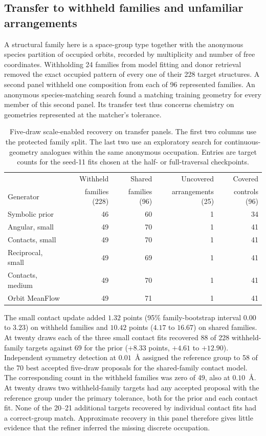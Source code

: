 \subsection{Transfer to withheld families and unfamiliar arrangements}

A structural family here is a space-group type together with the anonymous species partition of occupied orbits, recorded by multiplicity and number of free coordinates. Withholding 24 families from model fitting and donor retrieval removed the exact occupied pattern of every one of their 228 target structures. A second panel withheld one composition from each of 96 represented families. An anonymous species-matching search found a matching training geometry for every member of this second panel. Its transfer test thus concerns chemistry on geometries represented at the matcher's tolerance.

\begin{table}[tbp]\centering\small
\caption{Five-draw scale-enabled recovery on transfer panels. The first two columns use the protected family split. The last two use an exploratory search for continuous-geometry analogues within the same anonymous occupation. Entries are target counts for the seed-11 fits chosen at the half- or full-traversal checkpoints.}
\label{tab:gen-transfer}
\begin{tabular}{lrrrr}\hline
 & Withheld & Shared & Uncovered & Covered\\
Generator & families (228) & families (96) & arrangements (25) & controls (96)\\\hline
Symbolic prior & 46 & 60 & 1 & 34\\
Angular, small & 49 & 70 & 1 & 41\\
Contacts, small & 49 & 70 & 1 & 41\\
Reciprocal, small & 49 & 69 & 1 & 41\\
Contacts, medium & 49 & 70 & 1 & 41\\
Orbit MeanFlow & 49 & 71 & 1 & 41\\\hline
\end{tabular}
\end{table}

The small contact update added $1.32$ points (95\% family-bootstrap interval $0.00$ to $3.23$) on withheld families and $10.42$ points ($4.17$ to $16.67$) on shared families. At twenty draws each of the three small contact fits recovered 88 of 228 withheld-family targets against 69 for the prior ($+8.33$ points, $+4.61$ to $+12.90$). Independent symmetry detection at $0.01$~\AA{} assigned the reference group to 58 of the 70 best accepted five-draw proposals for the shared-family contact model. The corresponding count in the withheld families was zero of 49, also at $0.10$~\AA. At twenty draws two withheld-family targets had any accepted proposal with the reference group under the primary tolerance, both for the prior and each contact fit. None of the 20--21 additional targets recovered by individual contact fits had a correct-group match. Approximate recovery in this panel therefore gives little evidence that the refiner inferred the missing discrete occupation.

